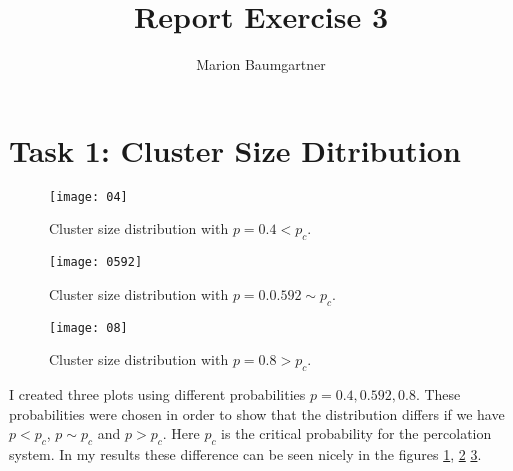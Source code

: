 \documentclass[a4paper,10pt]{article}
\title{Report Exercise 3}
\author{Marion Baumgartner}
\begin{document}
\maketitle

\section{Task 1: Cluster Size Ditribution}

\begin{figure}[h]
\centering
 \texttt{[image: 04]}
 \caption{Cluster size distribution with $p=0.4<p_c$.}
\label{fig1}
\end{figure}

\begin{figure}
\centering
 \texttt{[image: 0592]}
 \caption{Cluster size distribution with $p=0.0.592 \sim p_c$.}
\label{fig2}
\end{figure}


\begin{figure}
\centering
 \texttt{[image: 08]}
 \caption{Cluster size distribution with $p=0.8>p_c$.}
\label{fig3}
\end{figure}

I created three plots using different probabilities $p=0.4, 0.592, 0.8$. These probabilities were chosen in order to show that the distribution differs if we have $p<p_c$, $p\sim p_c$ and $p>p_c$. Here $p_c$ is the critical probability for the percolation system. In my results these difference can be seen nicely in the figures \ref{fig1}, \ref{fig2} \ref{fig3}.
\end{document}
